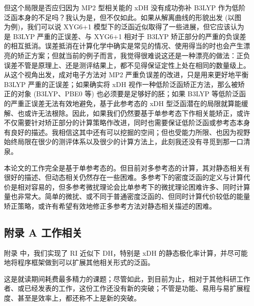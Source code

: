 但这个局限是否应归因为 MP2 型相关能的 xDH 没有成功弥补 B3LYP 作为低阶泛函本身的不足吗？我认为是，但不仅如此。如果从解离曲线的形貌出发 (以图  为例)，我们可以说 XYG6+1 模型下的泛函近似取得了一些进展，但它应该认为是 B3LYP 严重的正误差、与 XYG6+1 相对于 B3LYP 矫正部分的严重的负误差的相互抵消。误差抵消在计算化学中确实是常见的情况、使用得当的时也会产生漂亮的矫正方案；但就当前的例子而言，我觉得很难说这还是一种漂亮的做法：正负误差不管是原理上、还是测评结果上，都不见得保证定性上处在相同的数量级上。从这个视角出发，成对电子方法对 MP2 严重负误差的改进，只是用来更好地平衡 B3LYP 严重的正误差；如果确实将 xDH 视作一种低阶泛函矫正方法，那么被矫正的对象 (B3LYP、PBE0 等) 也必须要是足够好的胚；如果 B3LYP 等低阶泛函的严重正误差无法有效地避免，基于此参考态的 xDH 型泛函潜在的局限就算能缓解、也或许无法根除。因此，如果我们仍然要基于单参考态下作相关能矫正，或许不仅需要针对矫正部分的计算策略作改进\cite{Zhang-Xu.JPCL.2019}，同时也需要保证低阶泛函或参考态本身有良好的描述\cite{Becke-Becke.TCC.2014, Ai-Su.JPCL.2021, Kirkpatrick-Cohen.S.2021, Liu-He.NCS.2022}。我相信这其中还有可以挖掘的空间；但也受能力所限、也因为视野始终局限在很少的测评体系以及很少的计算方法上，此刻我还没有寻觅到那一口清泉。

本论文的工作完全是基于单参考态的。但目前对多参考态的计算，其对静态相关有很好的描述、但动态相关仍然存在一些困难。多参考下的密度泛函的定义与计算代价是相对容易的\cite{LiManni-Gagliardi.JCTC.2014, Feng-Xu.chemRxiv.2023}，但多参考微扰理论\cite{Finley-Serrano-Andres.CPL.1998, Angeli-Malrieu.JCP.2001, Angeli-Malrieu.CPL.2001, Malmqvist-Gagliardi.JCP.2008, Pulay-Pulay.IJQC.2011}会比单参考下的微扰理论困难许多、同时计算量也非常大。简单的微扰、或不同于普通密度泛函的、但同时计算代价较低的能量矫正策略，或许有希望有效地修正多参考方法对静态相关描述的困难。

\subsection*{附录 A 工作相关}

附录  中，我们实现了 RI 近似下 DH，特别是 xDH 的静态极化率计算，并尽可能地将程序框架做到可以扩展其他相关形式的泛函。

这是就读期间耗费最多精力的课题；尽管如此，到目前为止，相对于其他科研工作者、或已经发表的工作，这份工作还没有新的突破；不管是功能、易用与易扩展程度、甚至是效率上，都还称不上是新的突破。

